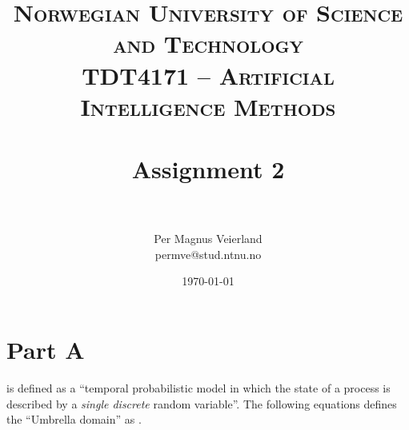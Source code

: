 

\usepackage{float}

\title{	
\normalfont \normalsize 
\textsc{Norwegian University of Science and Technology\\TDT4171 -- Artificial Intelligence Methods} \\ [25pt]
\horrule{0.5pt} \\[0.4cm]
\huge Assignment 2 \\
\horrule{2pt} \\[0.5cm]
}

\author{Per Magnus Veierland\\permve@stud.ntnu.no}

\date{\normalsize\today}



\maketitle

\section*{Part A}

 is defined as a ``temporal probabilistic model in which the state of a process is described by a \textit{single discrete} random variable''. The following equations defines the ``Umbrella domain'' as .


